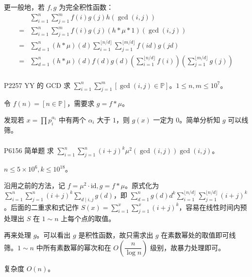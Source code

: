 \documentclass[../main.tex]{subfiles}
\begin{document}
\begin{frame}
更一般地，若 $f,g$ 为完全积性函数：
$$
\begin{aligned}
&\sum_{i=1}^n\sum_{j=1}^mf(i)g(j)h(\gcd(i,j))\\
=&\sum_{i=1}^n\sum_{j=1}^mf(i)g(j)(h*\mu*1)(\gcd(i,j))\\
=&\sum_{d=1}^n(h*\mu)(d)\sum_{i=1}^{\lfloor n/d\rfloor}\sum_{j=1}^{\lfloor m/d\rfloor}f(id)g(jd)\\
=&\sum_{d=1}^n(h*\mu)(d)f(d)g(d)(\sum_{i=1}^{\lfloor n/d\rfloor}f(i))(\sum_{j=1}^{\lfloor m/d\rfloor}g(j))
\end{aligned}
$$
\end{frame}

\subsubsection{}

\begin{frame}{P2257 YY 的 GCD}
求 $\sum\limits_{i=1}^n\sum\limits_{j=1}^m[\gcd(i,j)\in\mathbb{P}]$。$1\le n,m\le 10^7$。\pause
\bigskip

令 $f(n)=[n\in \mathbb P]$，需要求 $g=f*\mu$。\pause

发现若 $x=\prod\limits p_i^{\alpha_i}$ 中有两个 $\alpha_i$ 大于 $1$，则 $g(x)$ 一定为 $0$。简单分析知 $g$ 可以线筛。
\end{frame}

\subsubsection{}

\begin{frame}{P6156 简单题}
求 $\sum\limits_{i=1}^n\sum\limits_{j=1}^n(i+j)^k\mu^2(\gcd(i,j))\gcd(i,j)$。

$n\le 5\times10^6,k\le 10^{18}$。
\end{frame}

\begin{frame}
沿用之前的方法，记 $f=\mu^2\cdot\text{id},g=f*\mu$。原式化为 $\sum\limits_{i=1}^n\sum\limits_{j=1}^n(i+j)^k\sum\limits_{d\mid i,j}g(d)$，即 $\sum_{d=1}^ng(d)d^k\sum_{i=1}^{\lfloor n/d\rfloor}\sum_{j=1}^{\lfloor n/d\rfloor}(i+j)^k$。后面的二重求和式记作 $S(x)=\sum\limits_{i=1}^x\sum\limits_{j=1}^x(i+j)^k$，容易在线性时间内预处理出 $S$ 在 $1\sim n$ 上每个点的取值。\pause

再来处理 $g$。可以看出 $g$ 是积性函数，故只需求出 $g$ 在素数幂处的取值即可线筛。$1\sim n$ 中所有素数幂的幂次和在 $O(\dfrac{n}{\log n})$ 级别，故暴力处理即可。\pause

复杂度 $O(n)$。
\end{frame}
\end{document}
